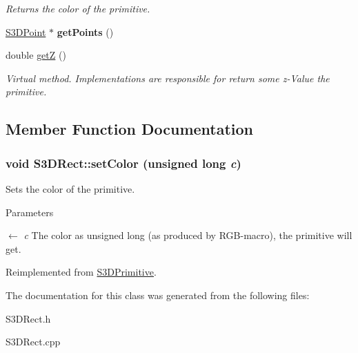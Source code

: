 \begin{DoxyCompactItemize}
\begin{DoxyCompactList}\small\item\em Returns the color of the primitive. \item\end{DoxyCompactList}\item 
\hypertarget{class_s3_d_rect_a626b39ee85c2ab329258bba6ee0ac255}{
\hyperlink{class_s3_d_point}{S3DPoint} $\ast$ {\bfseries getPoints} ()}
\label{class_s3_d_rect_a626b39ee85c2ab329258bba6ee0ac255}

\item 
\hypertarget{class_s3_d_rect_a7b3fb925a55d8a22a354829d6a5afa3d}{
double \hyperlink{class_s3_d_rect_a7b3fb925a55d8a22a354829d6a5afa3d}{getZ} ()}
\label{class_s3_d_rect_a7b3fb925a55d8a22a354829d6a5afa3d}

\begin{DoxyCompactList}\small\item\em Virtual method. Implementations are responsible for return some z-\/Value the primitive. \item\end{DoxyCompactList}\end{DoxyCompactItemize}


\subsection{Member Function Documentation}
\hypertarget{class_s3_d_rect_af1a976fbe476e7096b2ceded7ab1659c}{
\subsubsection[{setColor}]{\setlength{\rightskip}{0pt plus 5cm}void S3DRect::setColor (unsigned long {\em c})}}
\label{class_s3_d_rect_af1a976fbe476e7096b2ceded7ab1659c}


Sets the color of the primitive. 


\begin{DoxyParams}{Parameters}
\item[\mbox{$\leftarrow$} {\em c}]The color as unsigned long (as produced by RGB-\/macro), the primitive will get. \end{DoxyParams}


Reimplemented from \hyperlink{class_s3_d_primitive_a1c8f036193987522bdfb6a49b9b74000}{S3DPrimitive}.



The documentation for this class was generated from the following files:\begin{DoxyCompactItemize}
\item 
S3DRect.h\item 
S3DRect.cpp\end{DoxyCompactItemize}

